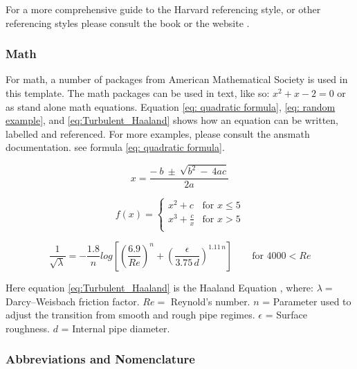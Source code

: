 For a more comprehensive guide to the Harvard referencing style, or other referencing styles please consult the book \textcite{Pears:Shields:2010} or the website \textcite{cite_them_right}.

\subsubsection{Math}

For math, a number of packages from American Mathematical Society is used in this template. The math packages can  be used in text, like so: $x^{2} + x - 2 = 0$ or as stand alone math equations. Equation \ref{eq: quadratic formula}, \ref{eq: random example}, and \ref{eq:Turbulent_Haaland} shows how an equation can be written, labelled and referenced. For more examples, please consult the ansmath documentation. see formula \ref{eq: quadratic formula}.

\begin{equation}
    x = \frac{-\ b \  \pm \ \sqrt{b^{2} \ - \ 4ac}}{2a}
    \label{eq: quadratic formula}
\end{equation}

\begin{equation}
    \label{eq: random example}
    f(x) =
    \begin{cases}
       x^{2} + c & \text{for $x \leq 5$}\\
       x^{3} + \frac{c}{x}& \text{for $x > 5$}\\
    \end{cases}       
\end{equation}

\begin{equation}
    \label{eq:Turbulent_Haaland}
    \frac{1}{\sqrt{\lambda}} = - \frac{1.8}{n} log\left[\left(\frac{6.9}{Re}\right)^{n} + \left(\frac{\epsilon}{3.75\,d}\right)^{1.11\,n}\right]  \qquad \text{for $4000 < Re$}
\end{equation}


Here equation \ref{eq:Turbulent_Haaland} is the Haaland Equation \parencite{Haaland:1983}, where: $\lambda =$ Darcy–Weisbach friction factor. $Re =$ Reynold's number. $n$ = Parameter used to adjust the transition from smooth and rough pipe regimes. $\epsilon$ = Surface roughness. $d$ = Internal pipe diameter.

\subsubsection{Abbreviations and Nomenclature}

